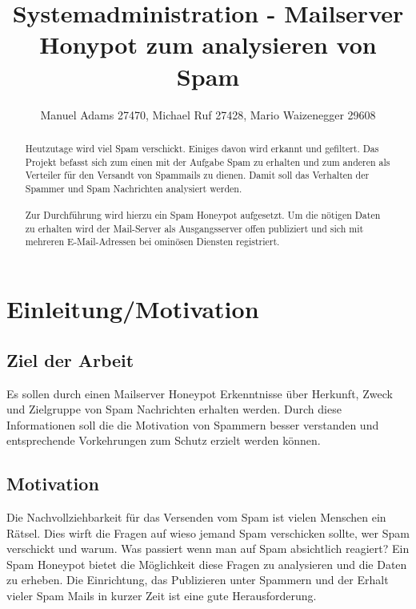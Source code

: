 \documentclass[a4paper,11pt,singlespacing]{article}
\begin{document}

\title{Systemadministration - Mailserver Honypot zum analysieren von Spam}
\author{Manuel Adams 27470, Michael Ruf 27428, Mario Waizenegger 29608}
\maketitle
\begin{abstract}
Heutzutage wird viel Spam verschickt. Einiges davon wird erkannt und gefiltert.
Das Projekt befasst sich zum einen mit der Aufgabe Spam zu erhalten und zum anderen als Verteiler für den Versandt von Spammails zu dienen.
Damit soll das Verhalten der Spammer und Spam Nachrichten analysiert werden.
\\\\
Zur Durchführung wird hierzu ein Spam Honeypot aufgesetzt.
Um die nötigen Daten zu erhalten wird der Mail-Server als Ausgangsserver offen publiziert und sich mit mehreren E-Mail-Adressen bei ominösen Diensten registriert.
\end{abstract}

\newpage

\tableofcontents

\newpage
{}

\section{Einleitung/Motivation}\label{sec:Einleitung}

	\subsection{Ziel der Arbeit}\label{sec:EinleitungZiel}
		Es sollen durch einen Mailserver Honeypot Erkenntnisse über Herkunft, Zweck und Zielgruppe von Spam Nachrichten erhalten werden.
		Durch diese Informationen soll die die Motivation von Spammern besser verstanden und entsprechende Vorkehrungen zum Schutz erzielt werden können.

	\subsection{Motivation}\label{sec:EinleitungMotivation}
		Die Nachvollziehbarkeit für das Versenden vom Spam ist vielen Menschen ein Rätsel.
		Dies wirft die Fragen auf wieso jemand Spam verschicken sollte, wer Spam verschickt und warum.
		Was passiert wenn man auf Spam absichtlich reagiert?
		Ein Spam Honeypot bietet die Möglichkeit diese Fragen zu analysieren und die Daten zu erheben.
		Die Einrichtung, das Publizieren unter Spammern und der Erhalt vieler Spam Mails in kurzer Zeit ist eine gute Herausforderung.
	
\end{document}

